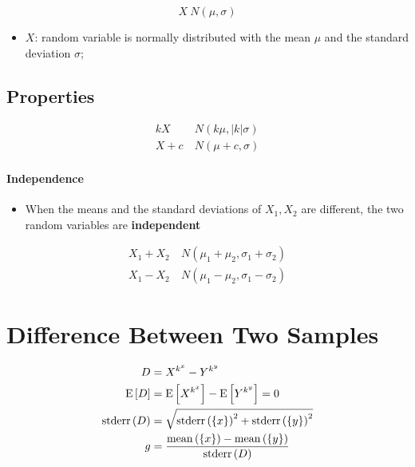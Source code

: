   \begin{equation}
    X ~ N\left( \mu, \sigma \right)
  \end{equation}

  \begin{itemize}
    \item $ X $: random variable is normally distributed with the mean $ \mu $ and the standard deviation $ \sigma $;
  \end{itemize}
  
  \subsection{Properties}
    
    \begin{align*}
      kX &~ N\left( k \mu, \left| k \right| \sigma \right) \\
      X + c &~ N\left( \mu + c, \sigma \right)
    \end{align*}
    
    \paragraph{Independence}
    \begin{itemize}
      \item When the means and the standard deviations of $ X_{1}, X_{2} $ are different, the two random variables are \textbf{independent}
    \end{itemize}
    
    \begin{align*}
      X_{1} + X_{2} &~ N\left( \mu_{1} + \mu_{2}, \sigma_{1} + \sigma_{2} \right) \\
      X_{1} - X_{2} &~ N\left( \mu_{1} - \mu_{2}, \sigma_{1} - \sigma_{2} \right)
    \end{align*}
    
\section{Difference Between Two Samples}

  \begin{align}
    D &= X^{k^{x}} - Y^{k^{y}} \\
    \operatorname{E}\left[ D \right] &= \operatorname{E}\left[ X^{k^{x}} \right] - \operatorname{E}\left[ Y^{k^{y}} \right] = 0 \\ 
    \operatorname{stderr}\left( D \right) &= \sqrt{ \operatorname{stderr}\left( \{ x \} \right)^{2} + \operatorname{stderr}\left( \{ y \} \right)^{2} } \\
    g &= \frac{ \operatorname{mean}\left( \{ x \} \right) - \operatorname{mean}\left( \{ y \} \right) }{\operatorname{stderr}\left( D \right)} \\
  \end{align}

